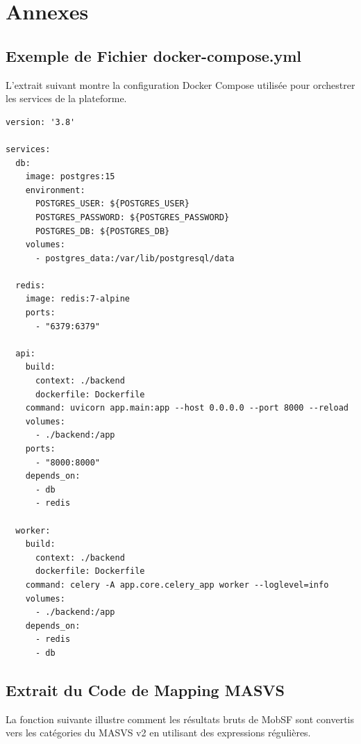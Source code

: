 \chapter{Annexes}
\label{chap:annexes}

\section{Exemple de Fichier docker-compose.yml}
L'extrait suivant montre la configuration Docker Compose utilisée pour orchestrer les services de la plateforme.

\begin{tcolorbox}[codebox, title={Extrait de \code{docker-compose.yml}}]
\begin{verbatim}
version: '3.8'

services:
  db:
    image: postgres:15
    environment:
      POSTGRES_USER: ${POSTGRES_USER}
      POSTGRES_PASSWORD: ${POSTGRES_PASSWORD}
      POSTGRES_DB: ${POSTGRES_DB}
    volumes:
      - postgres_data:/var/lib/postgresql/data

  redis:
    image: redis:7-alpine
    ports:
      - "6379:6379"

  api:
    build:
      context: ./backend
      dockerfile: Dockerfile
    command: uvicorn app.main:app --host 0.0.0.0 --port 8000 --reload
    volumes:
      - ./backend:/app
    ports:
      - "8000:8000"
    depends_on:
      - db
      - redis

  worker:
    build:
      context: ./backend
      dockerfile: Dockerfile
    command: celery -A app.core.celery_app worker --loglevel=info
    volumes:
      - ./backend:/app
    depends_on:
      - redis
      - db
\end{verbatim}
\end{tcolorbox}

\section{Extrait du Code de Mapping MASVS}
La fonction suivante illustre comment les résultats bruts de MobSF sont convertis vers les catégories du MASVS v2 en utilisant des expressions régulières.

